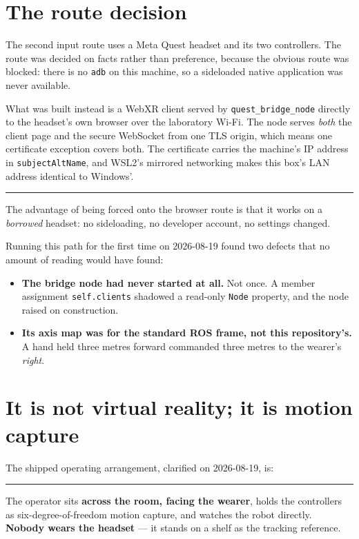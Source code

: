 \documentclass[11pt,a4paper,oneside]{report}
\newcommand{\code}[1]{\texttt{\small #1}}
\newcommand{\keyfact}[1]{%
  \par\vspace{7pt}\noindent
  \hspace*{0pt}\textcolor{srlblue}{\rule{2.5pt}{\dimexpr\baselineskip\relax}}%
  \hspace{9pt}%
  \begin{minipage}[t]{\dimexpr\textwidth-14pt\relax}
  \small #1
  \end{minipage}\par\vspace{7pt}}
\begin{document}
\section{The route decision}

The second input route uses a Meta Quest headset and its two controllers. The
route was decided on facts rather than preference, because the obvious route
was blocked: there is no \code{adb} on this machine, so a sideloaded native
application was never available.

What was built instead is a WebXR client served by
\code{quest\_bridge\_node} directly to the headset's own browser over the
laboratory Wi-Fi. The node serves \emph{both} the client page and the secure
WebSocket from one TLS origin, which means one certificate exception covers
both. The certificate carries the machine's IP address in
\code{subjectAltName}, and WSL2's mirrored networking makes this box's LAN
address identical to Windows'.

\keyfact{The advantage of being forced onto the browser route is that it works
on a \emph{borrowed} headset: no sideloading, no developer account, no settings
changed.}

Running this path for the first time on 2026-08-19 found two defects that no
amount of reading would have found:

\begin{itemize}
\item \textbf{The bridge node had never started at all.} Not once. A member
      assignment \code{self.clients} shadowed a read-only \code{Node} property,
      and the node raised on construction.
\item \textbf{Its axis map was for the standard ROS frame, not this
      repository's.} A hand held three metres forward commanded three metres to
      the wearer's \emph{right}.
\end{itemize}

\section{It is not virtual reality; it is motion capture}

The shipped operating arrangement, clarified on 2026-08-19, is:

\keyfact{The operator sits \textbf{across the room, facing the wearer}, holds
the controllers as six-degree-of-freedom motion capture, and watches the robot
directly. \textbf{Nobody wears the headset} --- it stands on a shelf as the
tracking reference.}
\end{document}
